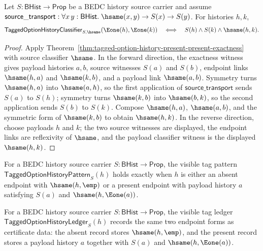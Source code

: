 \begin{theorem}
\label{thm:tagged-option-history-hsame-present-exactness}
Let $S:\mathsf{BHist}\to\mathsf{Prop}$ be a BEDC history source carrier and assume $\mathsf{source\_transport}:\forall x\,y:\mathsf{BHist}.\; \hsame(x,y)\to S(x)\to S(y)$. For histories $h,k$,
$$
\mathsf{TaggedOptionHistoryClassifier}_{S,\hsame}(\Eone(h),\Eone(k))
\quad\Longleftrightarrow\quad
S(h)\land S(k)\land \hsame(h,k).
$$
\end{theorem}
\begin{proof}
Apply Theorem~\ref{thm:tagged-option-history-present-present-exactness} with source classifier $\hsame$. In the forward direction, the exactness witness gives payload histories $a,b$, source witnesses $S(a)$ and $S(b)$, endpoint links $\hsame(h,a)$ and $\hsame(k,b)$, and a payload link $\hsame(a,b)$. Symmetry turns $\hsame(h,a)$ into $\hsame(a,h)$, so the first application of $\mathsf{source\_transport}$ sends $S(a)$ to $S(h)$; symmetry turns $\hsame(k,b)$ into $\hsame(b,k)$, so the second application sends $S(b)$ to $S(k)$. Compose $\hsame(h,a)$, $\hsame(a,b)$, and the symmetric form of $\hsame(k,b)$ to obtain $\hsame(h,k)$. In the reverse direction, choose payloads $h$ and $k$; the two source witnesses are displayed, the endpoint links are reflexivity of $\hsame$, and the payload classifier witness is the displayed $\hsame(h,k)$.
\end{proof}

\begin{definition}
\label{def:tagged-option-history-pattern}
For a BEDC history source carrier $S:\mathsf{BHist}\to\mathsf{Prop}$, the visible tag pattern $\mathsf{TaggedOptionHistoryPattern}_S(h)$ holds exactly when $h$ is either an absent endpoint with $\hsame(h,\emp)$ or a present endpoint with payload history $a$ satisfying $S(a)$ and $\hsame(h,\Eone(a))$.
\end{definition}

\begin{definition}
\label{def:tagged-option-history-ledger}
For a BEDC history source carrier $S:\mathsf{BHist}\to\mathsf{Prop}$, the visible tag ledger $\mathsf{TaggedOptionHistoryLedger}_S(h)$ records the same two endpoint forms as certificate data: the absent record stores $\hsame(h,\emp)$, and the present record stores a payload history $a$ together with $S(a)$ and $\hsame(h,\Eone(a))$.
\end{definition}

